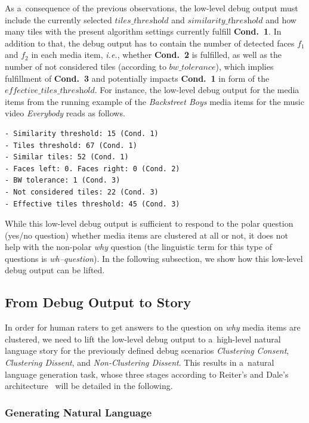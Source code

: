 As a~consequence of the previous observations, the low-level debug output
must include the currently selected $\textit{tiles\_threshold}$ and
$\textit{similarity\_threshold}$ and how many tiles with the present algorithm settings
currently fulfill \textbf{Cond.~1}.
In addition to that, the debug output has to contain
the number of detected faces $f_1$ and $f_2$ in each media item,
\emph{i.e.}, whether \textbf{Cond.~2} is fulfilled,
as well as the number of not considered tiles
(according to $\textit{bw\_tolerance}$), which implies fulfillment of \textbf{Cond.~3}
and potentially impacts \textbf{Cond.~1} in form of
the $\textit{effective\_tiles\_threshold}$.
For instance, the low-level debug output for the media items
from the running example of the \emph{Backstreet Boys} media items
for the music video \emph{Everybody} reads as follows.

\begin{verbatim}
- Similarity threshold: 15 (Cond. 1)
- Tiles threshold: 67 (Cond. 1)
- Similar tiles: 52 (Cond. 1)
- Faces left: 0. Faces right: 0 (Cond. 2)
- BW tolerance: 1 (Cond. 3)
- Not considered tiles: 22 (Cond. 3)
- Effective tiles threshold: 45 (Cond. 3)
\end{verbatim}

While this low-level debug output is sufficient to respond
to the polar question (yes/no question) whether media items
are clustered at all or not, it does not help with
the non-polar \emph{why} question
(the linguistic term for this type of questions is \emph{wh–question}).
In the following subsection, we show how
this low-level debug output can be lifted.

\subsection{From Debug Output to Story}
\label{sec:from-debug-output-to-story}

In order for human raters to get answers to the question on
\emph{why} media items are clustered, we need to lift the low-level debug output
to a~high-level natural language story for
the previously defined debug scenarios \textit{Clustering Consent},
\textit{Clustering Dissent}, and \textit{Non-Clustering Dissent}.
This results in a~natural language generation task,
whose three stages according to Reiter's and Dale's
architecture~\cite{reiter2000building} will be detailed in the following.

\subsubsection{Generating Natural Language}
\label{sec:text-to-speech-espeak}

